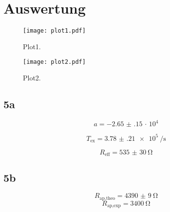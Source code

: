 \section{Auswertung}
\label{sec:Auswertung}

\begin{figure}
  \centering
  \texttt{[image: plot1.pdf]}
  \caption{Plot1.}
  \label{fig:plot1}
\end{figure}

\begin{figure}
  \centering
  \texttt{[image: plot2.pdf]}
  \caption{Plot2.}
  \label{fig:plot2}
\end{figure}


\subsection{5a}
\begin{equation}
   a = \num{-2.65(15)}\, \cdot\, 10^{4}
\end{equation}

\begin{equation}
   T_{\text{ex}} = \SI{3.78(21)e5}{\per\second}
\end{equation}

\begin{equation}
R_{\text{eff}} = \SI{535(30)}{\ohm}
\end{equation}


\subsection{5b}

\begin{equation}
  R_{\text{ap,theo}} = \SI{4390(9)}{\ohm}
  \end{equation}
\begin{equation}
  R_{\text{ap,exp}} = \SI{3400}{\ohm}
\end{equation}
